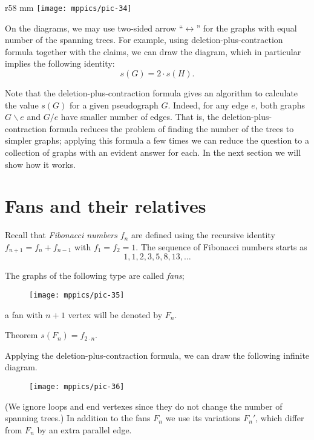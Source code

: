 \begin{wrapfigure}{r}{58 mm}
\vskip-0mm
\centering
\texttt{[image: mppics/pic-34]}
\vskip-0mm
\end{wrapfigure}

On the diagrams, we may use two-sided arrow ``$\leftrightarrow$'' for the graphs with equal number of the spanning trees.
For example, using deletion-plus-contraction formula together with the claims, we can draw the diagram, which in particular implies the following identity:
\[s(G)=2\cdot s(H).\]

Note that the deletion-plus-contraction formula gives an algorithm to calculate  the value $s(G)$ for a given pseudograph $G$.
Indeed, for any edge $e$, both graphs $G\backslash e$ and $G/e$ have smaller number of edges.
That is, the deletion-plus-contraction formula reduces the problem of finding the number of the trees to simpler graphs;
applying this formula a few times we can reduce the question to a collection of graphs with an evident answer for each.
In the next section we will show how it works.


 
\section*{Fans and their relatives}



Recall that \emph{Fibonacci numbers} $f_n$ are defined using the recursive identity 
$f_{n+1}=f_n+f_{n-1}$
with $f_1=f_2=1$.
The sequence of Fibonacci numbers starts as
\[1,1,2,3,5,8,13,\dots\]

The graphs of the following type are called \emph{fans}; 
\begin{figure}[h!]
\centering
\texttt{[image: mppics/pic-35]}
\end{figure}
a fan with $n+1$ vertex will be denoted by $F_n$. 

\begin{thm}{Theorem}\label{thm:fans}
$s(F_n)=f_{2\cdot n}$.
\end{thm}

Applying the deletion-plus-contraction formula, we can draw the following infinite diagram.
\begin{figure}[h!]
\centering
\texttt{[image: mppics/pic-36]}
\end{figure}
(We ignore loops and end vertexes since they do not change the number of spanning trees.)
In addition to the fans $F_n$ we use its variations $F_n'$, which differ from $F_n$ by an extra parallel edge.

